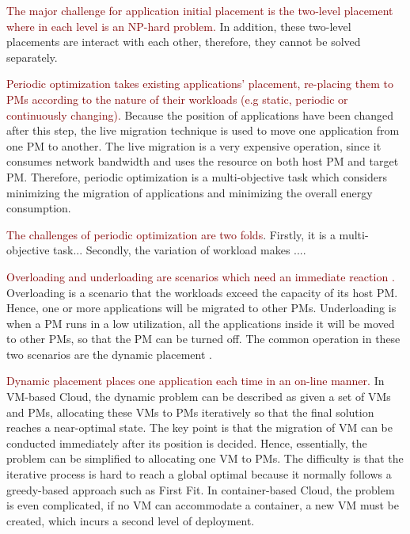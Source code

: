 \textcolor{Maroon}{The major challenge for application initial placement is the two-level placement where in each level is an NP-hard problem.} In addition, these two-level placements are interact with each other, therefore, they cannot be solved separately.


\textcolor{Maroon}{Periodic optimization takes existing applications' placement, re-placing them to PMs according to the nature of their workloads (e.g static, periodic or continuously changing).} Because the position of applications have been changed after this step, the live migration technique is used to move one application from one PM to another. The live migration is a very expensive operation, since it consumes network bandwidth and uses the resource on both host PM and target PM. Therefore, periodic optimization is a multi-objective task which considers minimizing the migration of applications and minimizing the overall energy consumption. 

\textcolor{Maroon}{The challenges of periodic optimization are two folds}. Firstly, it is a multi-objective task... Secondly, the variation of workload makes .... 

\textcolor{Maroon}{Overloading and underloading are scenarios which need an immediate reaction \cite{Beloglazov:2013ht}.}
Overloading is a scenario that the workloads exceed the capacity of its host PM. Hence, one or more applications will be migrated to other PMs. Underloading is when a PM runs in a low utilization, all the applications inside it will be moved to other PMs, so that the PM can be turned off. The common operation in these two scenarios are the dynamic placement \cite{Xiao:2015ik}. 

\textcolor{Maroon}{Dynamic placement places one application each time in an on-line manner.} 
In VM-based Cloud, the dynamic problem can be described as given a set of VMs and PMs, allocating these VMs to PMs iteratively so that the final solution reaches a near-optimal state.
The key point is that the migration of VM can be conducted immediately after its position is decided. Hence, essentially, the problem can be simplified to allocating one VM to PMs. The difficulty is that the iterative process is hard to reach a global optimal because it normally follows a greedy-based approach such as First Fit. In container-based Cloud,  the problem is even complicated, if no VM can accommodate a container, a new VM must be created, which incurs a second level of deployment.

